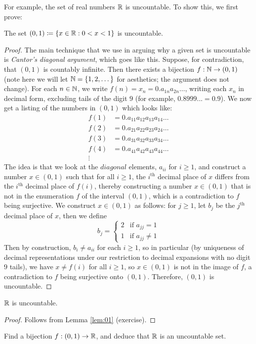 \documentclass[../analysis1.tex]{subfiles}
\begin{document}
\noindent For example, the set of real numbers $\mathbb{R}$ is uncountable. To show this, we first prove:

\begin{lemma}
\label{lem:01}
    \begin{shaded*}
        The set $(0,1)\coloneqq\{x\in\mathbb{R}:0<x<1\}$ is uncountable.
    \end{shaded*}
\end{lemma}
\begin{proof}
    The main technique that we use in arguing why a given set is uncountable is \textit{Cantor's diagonal argument}, which goes like this.
    Suppose, for contradiction, that $(0,1)$ is countably infinite. Then there exists a bijection $f:\mathbb{N}\to (0,1)$ (note here we will let $\mathbb{N}=\{1,2,\dots\}$ for aesthetics; the argument does not change).
    For each $n\in\mathbb{N}$, we write $f(n)=x_n=0.a_{1n}a_{2n}\dots$, writing each $x_n$ in decimal form, excluding tails of the digit $9$ (for example, $0.8999...=0.9$).
    We now get a listing of the numbers in $(0,1)$ which looks like:
    \begin{align*}
        f(1)&=0.a_{11}a_{12}a_{13}a_{14}\dots\\
        f(2)&=0.a_{21}a_{22}a_{23}a_{24}\dots\\
        f(3)&=0.a_{31}a_{32}a_{33}a_{34}\dots\\
        f(4)&=0.a_{41}a_{42}a_{43}a_{44}\dots\\
        \vdots
    \end{align*}
    The idea is that we look at the $diagonal$ elements, $a_{ii}$ for $i\ge 1$, and construct a number $x\in (0,1)$ such that for all $i\ge 1$,
    the $i^{\mathrm{th}}$ decimal place of $x$ differs from the $i^{\mathrm{th}}$ decimal place of $f(i)$, thereby constructing a number $x\in(0,1)$ that is not in the enumeration $f$ of the interval $(0,1)$, which is a contradiction to $f$ being surjective.
    We construct $x\in (0,1)$ as follows: for $j\ge 1$, let $b_{j}$ be the $j^{\mathrm{th}}$ decimal place of $x$, then we define
    $$b_j=\begin{cases}2 & \text{if }a_{jj}=1\\ 1 & \text{if }a_{jj}\ne 1\end{cases}$$
    Then by construction, $b_i \ne a_{ii}$ for each $i\ge 1$, so in particular (by uniqueness of decimal representations under our restriction to decimal expansions with no digit $9$ tails), we have $x\ne f(i)$ for all $i\ge 1$,
    so $x\in (0,1)$ is not in the image of $f$, a contradiction to $f$ being surjective onto $(0,1)$. Therefore, $(0,1)$ is uncountable.\qedhere
\end{proof}
\begin{theorem}
    \begin{shaded*}
        $\mathbb{R}$ is uncountable.
    \end{shaded*}
\end{theorem}
\begin{proof}
    Follows from Lemma \ref{lem:01} (exercise). \qedhere
\end{proof}

\begin{exercise*}
    Find a bijection $f:(0,1)\to \mathbb{R}$, and deduce that $\mathbb{R}$ is an uncountable set.
\end{exercise*}
\end{document}
